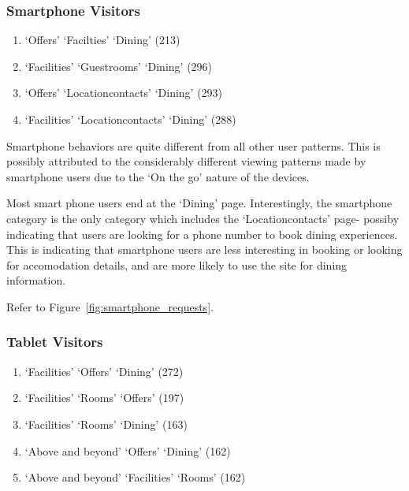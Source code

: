 \subsubsection{Smartphone Visitors}
\label{sec:results:platform:smartphone}

\begin{enumerate}
  \item `Offers' \ra{} `Facilties' \ra{} `Dining' (213)
  \item `Facilities' \ra{} `Guestrooms' \ra{} `Dining' (296)
  \item `Offers' \ra{} `Locationcontacts' \ra{} `Dining' (293)
  \item `Facilities' \ra{} `Locationcontacts' \ra{} `Dining' (288)
\end{enumerate}

Smartphone behaviors are quite different from all other user patterns. This is possibly attributed to the considerably different viewing patterns made by smartphone users due to the `On the go' nature of the devices.

Most smart phone users end at the `Dining' page. Interestingly, the smartphone category is the only category which includes the `Locationcontacts' page- possiby indicating that users are looking for a phone number to book dining experiences. This is indicating that smartphone users are less interesting in booking or looking for accomodation details, and are more likely to use the site for dining information.

Refer to Figure~\ref{fig:smartphone_requests}.


\subsubsection{Tablet Visitors}
\label{sec:results:platform:tablet}

\begin{enumerate}
  \item `Facilities' \ra{} `Offers' \ra{} `Dining' (272)
  \item `Facilities' \ra{} `Rooms' \ra{} `Offers' (197)
  \item `Facilities' \ra{} `Rooms' \ra{} `Dining' (163)
  \item `Above and beyond' \ra{} `Offers' \ra{} `Dining' (162)
  \item `Above and beyond' \ra{} `Facilities' \ra{} `Rooms' (162)
\end{enumerate}

